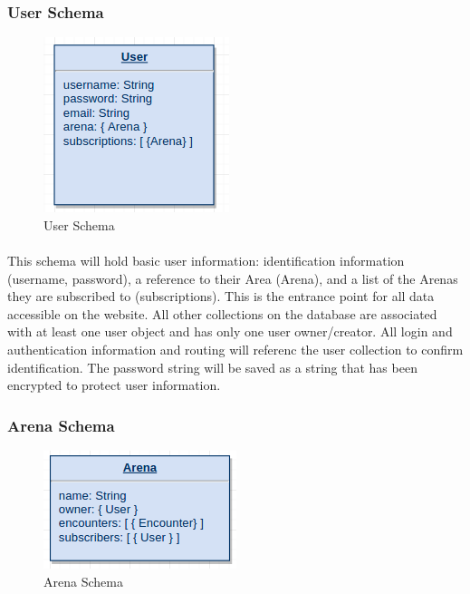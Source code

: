\documentclass[12pt,a4paper]{report}
\begin{document}
	\subsubsection{User Schema}
	\begin{figure}[H]
		\centering
		\includegraphics[scale=.75]{schema-user}
		\caption{User Schema}
		\label{fig: User Schema }
	\end{figure}
	
	\paragraph{}This schema will hold basic user information: identification information (username, password), a reference to their Area (Arena), and a list of the Arenas they are subscribed to (subscriptions). This is the entrance point for all data accessible on the website. All other collections on the database are associated with at least one user object and has only one user owner/creator. All login and authentication information and routing will referenc the user collection to confirm identification. The password string will be saved as a string that has been encrypted to protect user information.
	
	\subsubsection{Arena Schema}
	
	\begin{figure}[H]
		\centering
		\includegraphics[scale=.75]{schema-arena}
		\caption{Arena Schema}
		\label{fig: Arena Schema }
	\end{figure}
	
\end{document}
